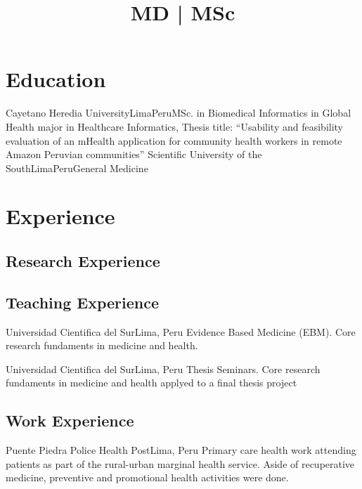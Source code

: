 \documentclass[11pt,a4paper,sans]{moderncv}
\title{MD | MSc }
\begin{document}
\makecvtitle

\section{Education}

{Cayetano Heredia University}{Lima}{Peru}{MSc. in Biomedical Informatics in Global Health major in Healthcare Informatics, Thesis title: “Usability and feasibility evaluation of an mHealth application for community health workers in remote Amazon Peruvian communities”}
{Scientific University of the South}{Lima}{Peru}{General Medicine}  

\section{Experience}
    \subsection{Research Experience}
        
        
        


    \subsection{Teaching Experience}
        {Universidad Cientifica del Sur}{Lima, Peru}{}
        {Evidence Based Medicine (EBM). Core research fundaments in medicine and health.}
        
        {Universidad Cientifica del Sur}{Lima, Peru}{}
        {Thesis Seminars. Core research fundaments in medicine and health applyed to a final thesis project}
        
    \subsection{Work Experience}
        {Puente Piedra Police Health Post}{Lima, Peru}{}
        {Primary care health work attending patients as part of the rural-urban marginal health service. Aside of recuperative medicine, preventive and promotional health activities were done.}
        
\end{document}
